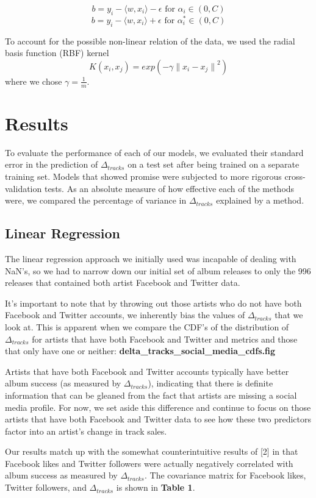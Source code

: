 \documentclass[conference]{IEEEtran}
\begin{document}
$$ b = y_i - \langle w, x_i \rangle - \epsilon \text{ for } \alpha_i \in (0,C)$$
$$ b = y_i - \langle w, x_i \rangle + \epsilon \text{ for } \alpha_i^* \in (0,C)$$

To account for the possible non-linear relation of the data, we used the radial basis function (RBF) kernel
$$K(x_i,x_j) = exp(-\gamma{\|x_i - x_j\|}^2)$$
where we chose $\gamma = \frac{1}{m}$.

\section{Results}
To evaluate the performance of each of our models, we evaluated their standard error in the prediction of $\Delta_{tracks}$ on a test set after being trained on a separate training set. Models that showed promise were subjected to more rigorous cross-validation tests. As an absolute measure of how effective each of the methods were, we compared the percentage of variance in $\Delta_{tracks}$ explained by a method.
\subsection{Linear Regression}
The linear regression approach we initially used was incapable of dealing with NaN's, so we had to narrow down our initial set of album releases to only the 996 releases that contained both artist Facebook and Twitter data.

It's important to note that by throwing out those artists who do not have both Facebook and Twitter accounts, we inherently bias the values of $\Delta_{tracks}$ that we look at. This is apparent when we compare the CDF's of the distribution of $\Delta_{tracks}$ for artists that have both Facebook and Twitter and metrics and those that only have one or neither: \textbf{delta\_tracks\_social\_media\_cdfs.fig}

Artists that have both Facebook and Twitter accounts typically have better album success (as measured by $\Delta_{tracks}$), indicating that there is definite information that can be gleaned from the fact that artists are missing a social media profile. For now, we set aside this difference and continue to focus on those artists that have both Facebook and Twitter data to see how these two predictors factor into an artist's change in track sales.

Our results match up with the somewhat counterintuitive results of [2] in that Facebook likes and Twitter followers were actually negatively correlated with album success as measured by $\Delta_{tracks}$. The covariance matrix for Facebook likes, Twitter followers, and $\Delta_{tracks}$ is shown in \textbf{Table 1}.
\end{document}
